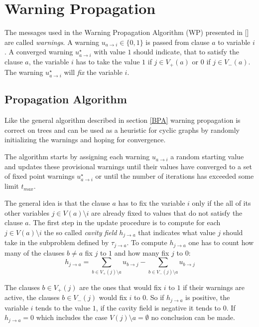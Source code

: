 \section{Warning Propagation}

The messages used in the Warning Propagation Algorithm (WP) presented in [\cite{dummyzitat}] are called \emph{warnings}. A warning $u_{a\rightarrow i} \in \{0, 1\}$ is passed from clause $a$ to variable $i$. A converged warning  $u^{\star}_{a\rightarrow i}$ with value $1$ should indicate, that  to satisfy the clause $a$, the variable $i$ has to take the value $1$ if $j \in V_+(a)$ or $0$ if $j \in V_-(a)$. The warning $u^{\star}_{a \rightarrow i}$ will \emph{fix} the variable $i$. 
\subsection{Propagation Algorithm}

Like the general algorithm described in section \ref{BPA} warning propagation is correct on trees and can be used as a heuristic for cyclic graphs by randomly initializing the warnings and hoping for convergence.

The algorithm starts by assigning each warning $u_{a\rightarrow i}$ a random starting value and updates these provisional warnings until their values have converged to a set of fixed point warnings $u^{\star}_{a \rightarrow i}$ or until the number of iterations has exceeded some limit $t_{max}$.

The general idea is that the clause $a$ has to fix the variable $i$ only if the all of its other variables $j \in V(a)\setminus i$ are already fixed to values that do not satisfy the clause $a$. \newline
The first step in the update procedure is to compute for each $j \in V(a) \setminus i$ the so called \emph{cavity field} $h_{j \rightarrow a}$ that indicates what value $j$ should take in the subproblem defined by $\tau_{j \rightarrow a}$. To compute $h_{j \rightarrow a}$ one has to count how many of the clauses $b \neq a$ fix $j$ to $1$ and how many fix $j$ to $0$:
$$h_{j \rightarrow a} = \sum_{b \in V_+(j)\setminus a}{u_{b \rightarrow j}} - \sum_{b \in V_-(j)\setminus a}{u_{b \rightarrow j}}$$

The clauses $b \in V_+(j)$ are the ones that would fix $i$ to $1$ if their warnings are active, the clauses $b \in V_-(j)$ would fix $i$ to $0$.
So if $h_{j \rightarrow a}$ is positive, the variable $i$ tends to the value $1$, if the cavity field is negative it tends to $0$. If $h_{j \rightarrow a} = 0$ which includes the case $V(j) \setminus a = \emptyset$ no conclusion can be made.

